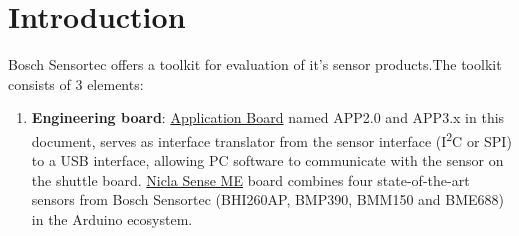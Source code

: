 \documentclass{article}
\begin{document}
\section{Introduction}

Bosch Sensortec offers a toolkit for evaluation of it's sensor products.The toolkit consists of 3 elements:

\begin{enumerate}
	
	\item \textbf{Engineering board}: \href{https://www.bosch-sensortec.com/bst/support_tools/application_boards/overview_application_boards}{Application Board} named APP2.0 and APP3.x in this document, serves as interface translator from the sensor interface (I\textsuperscript{2}C or SPI) to a USB interface, allowing PC software to communicate with the sensor on the shuttle board. \href{https://store.arduino.cc/products/nicla-sense-me}{Nicla Sense ME} board combines four state-of-the-art sensors from Bosch Sensortec (BHI260AP, BMP390, BMM150 and BME688) in the Arduino ecosystem.
	

\end{enumerate}
\end{document}
